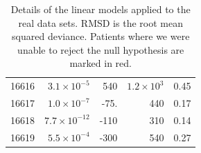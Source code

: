 \documentclass[12pt]{article}
\begin{document}
\begin{table}[!ht]
\begin{center}
\begin{tabular}{lrrrr}
16616 & $3.1 \times 10^{-5}$ & 540 & $1.2 \times 10^{3}$ & 0.45 \\
16617 & $1.0 \times 10^{-7}$ & -75. & 440 & 0.17 \\
16618 & $7.7 \times 10^{-12}$ & -110 & 310 & 0.14 \\
16619 & $5.5 \times 10^{-4}$ & -300 & 540 & 0.27 \\
\hline
\end{tabular}
\end{center}
  \caption{Details of the linear models applied to the real data sets. RMSD is the root mean squared deviance. Patients where we were unable to reject the null hypothesis are marked in red.
   }\label{tab:patientserror} 
\end{table}
\end{document}
